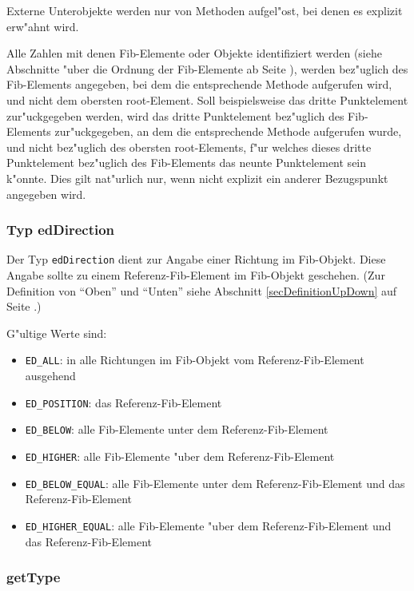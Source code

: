 Externe Unterobjekte werden nur von Methoden aufgel"ost, bei denen es explizit erw"ahnt wird.

Alle Zahlen mit denen Fib-Elemente oder Objekte identifiziert werden (siehe Abschnitte "uber die Ordnung der Fib-Elemente ab Seite \pageref{secOrderFibElements}), werden bez"uglich des Fib-Elements angegeben, bei dem die entsprechende Methode aufgerufen wird, und nicht dem obersten root-Element. Soll beispielsweise das dritte Punktelement zur"uckgegeben werden, wird das dritte Punktelement bez"uglich des Fib-Elements zur"uckgegeben, an dem die entsprechende Methode aufgerufen wurde, und nicht bez"uglich des obersten root-Elements, f"ur welches dieses dritte Punktelement bez"uglich des Fib-Elements das neunte Punktelement sein k"onnte.
Dies gilt nat"urlich nur, wenn nicht explizit ein anderer Bezugspunkt angegeben wird.

\subsubsection{Typ edDirection}
\label{secEdDirection}

Der Typ \verb|edDirection| dient zur Angabe einer Richtung im Fib-Objekt. Diese Angabe sollte zu einem Referenz-Fib-Element im Fib-Objekt geschehen. (Zur Definition von ``Oben'' und ``Unten'' siehe Abschnitt \ref{secDefinitionUpDown} auf Seite \pageref{secDefinitionUpDown} .)

\bigskip\noindent
G"ultige Werte sind:
\begin{itemize}
 \item \verb|ED_ALL|: in alle Richtungen im Fib-Objekt vom Referenz-Fib-Element ausgehend
 \item \verb|ED_POSITION|: das Referenz-Fib-Element
 \item \verb|ED_BELOW|: alle Fib-Elemente unter dem Referenz-Fib-Element
 \item \verb|ED_HIGHER|: alle Fib-Elemente "uber dem Referenz-Fib-Element
 \item \verb|ED_BELOW_EQUAL|: alle Fib-Elemente unter dem Referenz-Fib-Element und das Referenz-Fib-Element
 \item \verb|ED_HIGHER_EQUAL|: alle Fib-Elemente "uber dem Referenz-Fib-Element und das Referenz-Fib-Element
\end{itemize}


\subsubsection{getType}
\label{secGetType}

